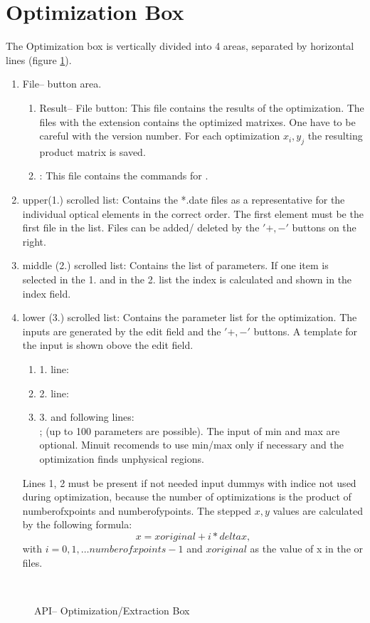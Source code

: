 \section {Optimization Box}

The Optimization box is vertically divided into 4 areas, separated by
horizontal lines (figure \ref {obox}). 
\begin {enumerate} 
\item File-- button area.
	\begin {enumerate} 
	\item Result-- File button: This file contains the results of the
optimization. The files with the extension  contains
the optimized matrixes. One have to be careful with the version number. For
each optimization $x_i, y_j$ the resulting product matrix is saved.
\item {}: This file contains the commands for 
\minuit.
\end {enumerate}      
\item  upper(1.) scrolled list: Contains the *.date files as a representative 
for the individual optical elements in the correct order. The first element 
must be the first file in the list. Files can be added/ deleted by the $'+,-'$ 
buttons  on  the right.
\item middle (2.) scrolled list: Contains the list of parameters. If one item
is selected in the 1. and in the 2. list the index is calculated and shown in 
the index field. 
\item lower (3.) scrolled list: Contains the parameter list for the
optimization. The inputs are generated by the edit field and the $'+,-'$
buttons. A template for the input is shown obove the edit field.
\begin {enumerate}   
\item 1. line:     
\item 2. line:     
\item 3. and following lines:\hfill \\
         ; (up to 100 
parameters are possible). The input of min and max are optional. {\sc
Minuit} recomends to use min/max only if necessary and the optimization finds
unphysical regions.   
\end {enumerate}      
Lines 1, 2 must be present if not needed input dummys with indice not used
during optimization, because the number of optimizations is the product of 
numberofxpoints and numberofypoints. The stepped $x,y$ values are
calculated by the following formula:
\[ x= xoriginal + i * deltax,\]
with $i= 0,1,\ldots numberofxpoints-1$ and  $xoriginal$ as the value of x in
the  or  files.
\end {enumerate}  
\begin{figure}
\centerline{ \hbox{
 }}  
  \caption {\label{obox} \phase API-- Optimization/Extraction Box} 
\end {figure}   
 
